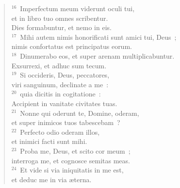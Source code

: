 \begin{flushleft}
\begin{verse}
${}^{16}$~Imperfectum meum viderunt oculi tui,\\ et in libro tuo omnes scribentur.\\ Dies formabuntur, et nemo in eis.\\
${}^{17}$~Mihi autem nimis honorificati sunt amici tui, Deus~;\\ nimis confortatus est principatus eorum.\\
${}^{18}$~Dinumerabo eos, et super arenam multiplicabuntur.\\ Exsurrexi, et adhuc sum tecum.\\
${}^{19}$~Si occideris, Deus, peccatores,\\ viri sanguinum, declinate a me~:\\
${}^{20}$~quia dicitis in cogitatione~:\\ Accipient in vanitate civitates tuas.\\
${}^{21}$~Nonne qui oderunt te, Domine, oderam,\\ et super inimicos tuos tabescebam~?\\
${}^{22}$~Perfecto odio oderam illos,\\ et inimici facti sunt mihi.\\
${}^{23}$~Proba me, Deus, et scito cor meum~;\\ interroga me, et cognosce semitas meas.\\
${}^{24}$~Et vide si via iniquitatis in me est,\\ et deduc me in via \ae terna.\end{verse}\end{flushleft}



